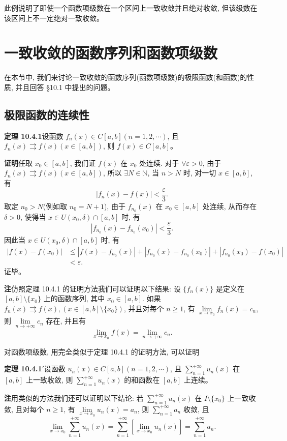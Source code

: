 \documentclass[UTF8, 12pt, fontset=fandol, oneside]{ctexart}
\begin{document}
此例说明了即使一个函数项级数在一个区间上一致收敛并且绝对收敛, 但该级数在该区间上不一定绝对一致收敛。

\section{一致收敛的函数序列和函数项级数}

在本节中, 我们来讨论一致收敛的函数序列(函数项级数)的极限函数(和函数)的性质, 并且回答 §10.1 中提出的问题。

\subsection{极限函数的连续性}

\noindent\textbf{定理 10.4.1}\quad 设函数 $f_n(x)\in C[a,b](n=1,2,\cdots)$, 且 $f_n(x)\rightrightarrows f(x)(x\in[a,b])$, 则 $f(x)\in C[a,b]$。

\noindent\textbf{证明}\quad 任取 $x_0\in[a,b]$, 我们证 $f(x)$ 在 $x_0$ 处连续. 对于 $\forall\varepsilon>0$, 由于 $f_n(x)\rightrightarrows f(x)(x\in[a,b])$, 所以 $\exists N\in\mathbb N$, 当 $n>N$ 时, 对一切 $x\in[a,b]$, 有
\[
  |f_n(x)-f(x)|<\frac\varepsilon3.
\]
取定 $n_0>N$(例如取 $n_0=N+1$), 由于 $f_{n_0}(x)$ 在 $x_0\in[a,b]$ 处连续, 从而存在 $\delta>0$, 使得当 $x\in U(x_0,\delta)\cap[a,b]$ 时, 有
\[
  |f_{n_0}(x)-f_{n_0}(x_0)|<\frac\varepsilon3.
\]
因此当 $x\in U(x_0,\delta)\cap[a,b]$ 时, 有
\[
\begin{aligned}
  |f(x)-f(x_0)|
  &\leq |f(x)-f_{n_0}(x)|+|f_{n_0}(x)-f_{n_0}(x_0)|+|f_{n_0}(x_0)-f(x_0)|\\
  &<\varepsilon.
\end{aligned}
\]
证毕。

\noindent\textbf{注}\quad 仿照定理 10.4.1 的证明方法我们可以证明以下结果: 设 $\{f_n(x)\}$ 是定义在 $[a,b]\setminus\{x_0\}$ 上的函数序列, 其中 $x_0\in[a,b]$. 如果 $f_n(x)\rightrightarrows f(x), (x\in[a,b]\setminus\{x_0\})$, 并且对每个 $n\geq1$, 有 $\lim\limits_{x\to x_0}f_n(x)=c_n$, 则 $\lim\limits_{n\to+\infty}c_n$ 存在, 并且有
\[
  \lim_{x\to x_0}f(x)=\lim_{n\to+\infty}c_n.
\]

对函数项级数, 用完全类似于定理 10.4.1 的证明方法, 可以证明

\noindent\textbf{定理 10.4.1$'$}\quad 设函数 $u_n(x)\in C[a,b](n=1,2,\cdots)$, 且 $\sum\limits_{n=1}^{+\infty}u_n(x)$ 在 $[a,b]$ 上一致收敛, 则 $\sum\limits_{n=1}^{+\infty}u_n(x)$ 的和函数在 $[a,b]$ 上连续。

\noindent\textbf{注}\quad 用类似的方法我们还可以证明以下结论: 若 $\sum\limits_{n=1}^{+\infty}u_n(x)$ 在 $I\setminus\{x_0\}$ 上一致收敛, 且对每个 $n\geq1$, 有 $\lim\limits_{x\to x_0}u_n(x)=a_n$, 则 $\sum\limits_{n=1}^{+\infty}a_n$ 收敛, 且
\[
  \lim_{x\to x_0}\sum_{n=1}^{+\infty}u_n(x)
  =\sum_{n=1}^{+\infty}\left[\lim_{x\to x_0}u_n(x)\right]
  =\sum_{n=1}^{+\infty}a_n.
\]
\end{document}
